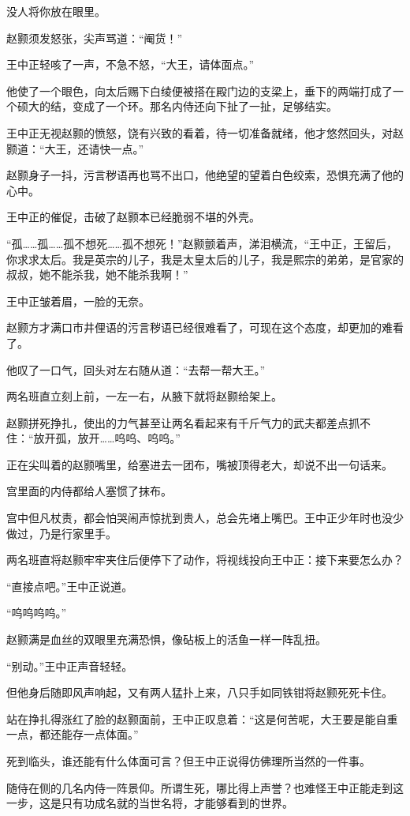没人将你放在眼里。

赵颢须发怒张，尖声骂道：“阉货！”

王中正轻咳了一声，不急不怒，“大王，请体面点。”

他使了一个眼色，向太后赐下白绫便被搭在殿门边的支梁上，垂下的两端打成了一个硕大的结，变成了一个环。那名内侍还向下扯了一扯，足够结实。

王中正无视赵颢的愤怒，饶有兴致的看着，待一切准备就绪，他才悠然回头，对赵颢道：“大王，还请快一点。”

赵颢身子一抖，污言秽语再也骂不出口，他绝望的望着白色绞索，恐惧充满了他的心中。

王中正的催促，击破了赵颢本已经脆弱不堪的外壳。

“孤……孤……孤不想死……孤不想死！”赵颢颤着声，涕泪横流，“王中正，王留后，你求求太后。我是英宗的儿子，我是太皇太后的儿子，我是熙宗的弟弟，是官家的叔叔，她不能杀我，她不能杀我啊！”

王中正皱着眉，一脸的无奈。

赵颢方才满口市井俚语的污言秽语已经很难看了，可现在这个态度，却更加的难看了。

他叹了一口气，回头对左右随从道：“去帮一帮大王。”

两名班直立刻上前，一左一右，从腋下就将赵颢给架上。

赵颢拼死挣扎，使出的力气甚至让两名看起来有千斤气力的武夫都差点抓不住：“放开孤，放开……呜呜、呜呜。”

正在尖叫着的赵颢嘴里，给塞进去一团布，嘴被顶得老大，却说不出一句话来。

宫里面的内侍都给人塞惯了抹布。

宫中但凡杖责，都会怕哭闹声惊扰到贵人，总会先堵上嘴巴。王中正少年时也没少做过，乃是行家里手。

两名班直将赵颢牢牢夹住后便停下了动作，将视线投向王中正：接下来要怎么办？

“直接点吧。”王中正说道。

“呜呜呜呜。”

赵颢满是血丝的双眼里充满恐惧，像砧板上的活鱼一样一阵乱扭。

“别动。”王中正声音轻轻。

但他身后随即风声响起，又有两人猛扑上来，八只手如同铁钳将赵颢死死卡住。

站在挣扎得涨红了脸的赵颢面前，王中正叹息着：“这是何苦呢，大王要是能自重一点，都还能存一点体面。”

死到临头，谁还能有什么体面可言？但王中正说得仿佛理所当然的一件事。

随侍在侧的几名内侍一阵景仰。所谓生死，哪比得上声誉？也难怪王中正能走到这一步，这是只有功成名就的当世名将，才能够看到的世界。

